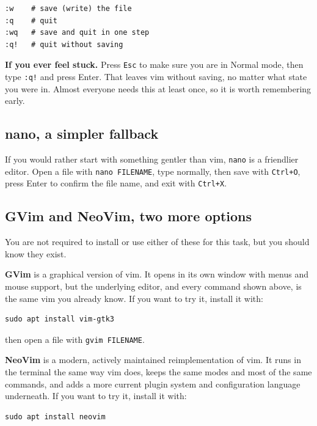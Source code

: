 \documentclass[11pt]{article}
\begin{document}
\begin{lstlisting}[language={}]
:w    # save (write) the file
:q    # quit
:wq   # save and quit in one step
:q!   # quit without saving
\end{lstlisting}

\noindent\textbf{\color{coaNavy}If you ever feel stuck.} Press \texttt{Esc}
to make sure you are in Normal mode, then type \texttt{:q!} and press Enter.
That leaves vim without saving, no matter what state you were in. Almost
everyone needs this at least once, so it is worth remembering early.

\subsection{nano, a simpler fallback}

If you would rather start with something gentler than vim, \texttt{nano} is
a friendlier editor. Open a file with \texttt{nano FILENAME}, type normally,
then save with \texttt{Ctrl+O}, press Enter to confirm the file name, and
exit with \texttt{Ctrl+X}.

\subsection{GVim and NeoVim, two more options}

You are not required to install or use either of these for this task, but
you should know they exist.

\textbf{GVim} is a graphical version of vim. It opens in its own window with
menus and mouse support, but the underlying editor, and every command shown
above, is the same vim you already know. If you want to try it, install it
with:

\begin{lstlisting}[language={}]
sudo apt install vim-gtk3
\end{lstlisting}

\noindent then open a file with \texttt{gvim FILENAME}.

\textbf{NeoVim} is a modern, actively maintained reimplementation of vim. It
runs in the terminal the same way vim does, keeps the same modes and most of
the same commands, and adds a more current plugin system and configuration
language underneath. If you want to try it, install it with:

\begin{lstlisting}[language={}]
sudo apt install neovim
\end{lstlisting}
\end{document}
